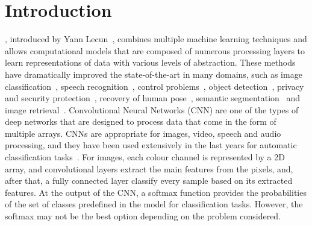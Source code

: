 \documentclass[journal]{IEEEtran}
\begin{document}
	
	
	\section{Introduction}
	\label{sect:introduction}
	, introduced by Yann Lecun~\cite{lecun2015deep}, combines multiple machine learning techniques and allows computational models that are composed of numerous processing layers to learn representations of data with various levels of abstraction. These methods have dramatically improved the state-of-the-art in many domains, such as image classification~\cite{cirecsan2012multi,he2016deep,krizhevsky2012imagenet}, speech recognition~\cite{hinton2012deep}, control problems~\cite{mnih2015human}, object detection~\cite{jiang2016speed,girshick2014rich}, privacy and security protection~\cite{yu2017iprivacy,yuan2019adversarial,tan2018deep}, recovery of human pose~\cite{hong2015multimodal}, semantic segmentation~\cite{long2015fully} and image retrieval~\cite{li2015weakly,jin2018deep}. Convolutional Neural Networks (CNN) are one of the types of deep networks that are designed to process data that come in the form of multiple arrays. CNNs are appropriate for images, video, speech and audio processing, and they have been used extensively in the last years for automatic classification tasks~\cite{dong2014learning,sun2013deep,ronneberger2015u}. For images, each colour channel is represented by a 2D array, and convolutional layers extract the main features from the pixels, and, after that, a fully connected layer classify every sample based on its extracted features. At the output of the CNN, a softmax function provides the probabilities of the set of classes predefined in the model for classification tasks. However, the softmax may not be the best option depending on the problem considered.
	
\end{document}
